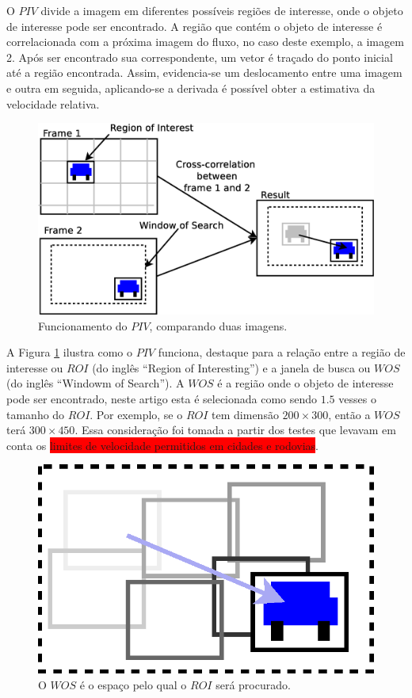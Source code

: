O $PIV$ divide a imagem em diferentes possíveis regiões de interesse, onde o objeto de interesse pode ser encontrado. 
A região que contém o objeto de 
interesse é correlacionada com a próxima imagem do fluxo, no caso deste exemplo, a imagem 2. 
Após ser encontrado sua correspondente, um vetor é traçado do ponto inicial
até a região encontrada. Assim, evidencia-se um deslocamento entre uma imagem e outra em seguida, aplicando-se  a derivada 
é possível obter a  estimativa da velocidade relativa.

\begin{figure}[H]
\includegraphics[width=\columnwidth]{images/explanationPIV.eps}
\caption{Funcionamento do $PIV$, comparando duas imagens.}
\label{fig:twoframes}
\end{figure}

A Figura \ref{fig:twoframes} ilustra como o $PIV$ funciona, 
destaque para a relação entre a região de interesse ou $ROI$ (do inglês ``Region of Interesting'') e 
a janela de busca ou $WOS$  (do inglês ``Windowm of Search''). 
A $WOS$ é a região onde o objeto de interesse pode ser encontrado,
neste artigo esta é selecionada como sendo $1.5$ vesses o tamanho do $ROI$. 
Por exemplo, se o $ROI$ tem dimensão $200\times300$, então a $WOS$ terá $300\times450$.
Essa consideração foi tomada a partir dos testes que 
levavam em conta os \colorbox{red}{limites de velocidade permitidos em cidades e rodovias}.


\begin{figure}[H]
\includegraphics[width=\columnwidth]{images/WOSdivided.eps}
\caption{O $WOS$ é o espaço pelo qual o $ROI$ será procurado.}
\label{fig:WOSdivided}
\end{figure}

